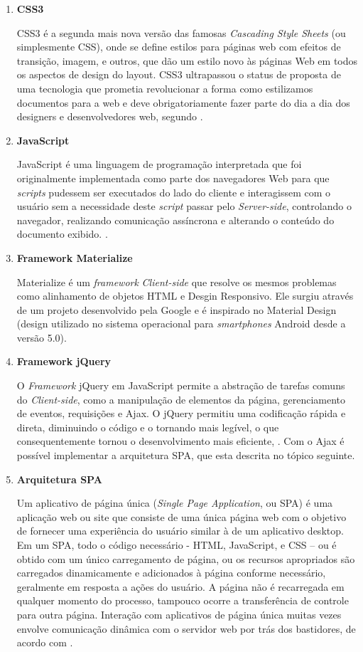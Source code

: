 \begin{enumerate}
\item \textbf{CSS3}

CSS3 é a segunda mais nova versão das famosas \textit{Cascading Style Sheets} (ou simplesmente CSS), onde se define estilos para páginas web com efeitos de transição, imagem, e outros, que dão um estilo novo às páginas Web em todos os aspectos de design do layout. CSS3 ultrapassou o status de proposta de uma tecnologia que prometia revolucionar a forma como estilizamos documentos para a web e deve obrigatoriamente fazer parte do dia a dia dos designers e desenvolvedores web, segundo .

\item \textbf{JavaScript}

JavaScript é uma linguagem de programação interpretada que foi originalmente implementada como parte dos navegadores Web para que \textit{scripts} pudessem ser executados do lado do cliente e interagissem com o usuário sem a necessidade deste \textit{script} passar pelo \textit{Server-side}, controlando o navegador, realizando comunicação assíncrona e alterando o conteúdo do documento exibido. \cite{flanagan2007javascript-UPPERCASE}.

\item \textbf{Framework Materialize}

Materialize é um \textit{framework} \textit{Client-side} que resolve os mesmos problemas como alinhamento de objetos HTML e Desgin Responsivo. Ele surgiu através de um projeto desenvolvido pela Google e é inspirado no Material Design (design utilizado no sistema operacional para \textit{smartphones} Android desde a versão 5.0).

\item \textbf{Framework {j}Query}

O \textit{Framework} jQuery em JavaScript permite a abstração de tarefas comuns do \textit{Client-side}, como a manipulação de elementos da página, gerenciamento de eventos, requisições e Ajax. O jQuery permitiu uma codificação rápida e direta, diminuindo o código e o tornando mais legível, o que consequentemente tornou o desenvolvimento mais eficiente, \cite{duckett2018javascript}. Com o Ajax é possível implementar a arquitetura SPA, que esta descrita no tópico seguinte.

\item \textbf{Arquitetura SPA}

Um aplicativo de página única (\textit{Single Page Application}, ou SPA) é uma aplicação web ou site que consiste de uma única página web com o objetivo de fornecer uma experiência do usuário similar à de um aplicativo desktop. Em um SPA, todo o código necessário - HTML, JavaScript, e CSS – ou é obtido com um único carregamento de página, ou os recursos apropriados são carregados dinamicamente e adicionados à página conforme necessário, geralmente em resposta a ações do usuário. A página não é recarregada em qualquer momento do processo, tampouco ocorre a transferência de controle para outra página. Interação com aplicativos de página única muitas vezes envolve comunicação dinâmica com o servidor web por trás dos bastidores, de acordo com .


\end{enumerate}
